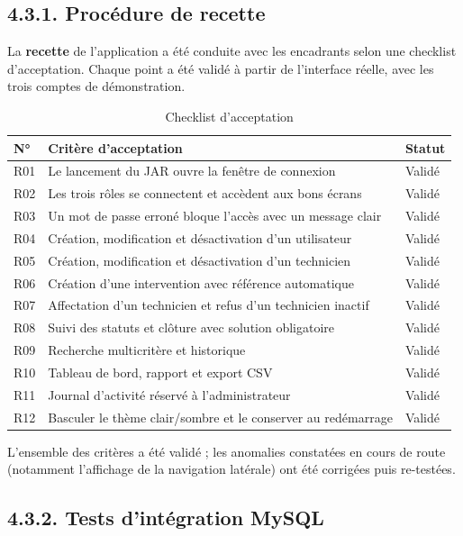 \documentclass[11pt,a4paper]{report}
\begin{document}
\subsection*{4.3.1. Procédure de recette}

La \textbf{recette} de l'application a été conduite avec les encadrants selon une checklist d'acceptation. Chaque point a été validé à partir de l'interface réelle, avec les trois comptes de démonstration.
\begin{table}[htbp]\centering\small
\begin{tabularx}{\textwidth}{|X|X|X|}
\hline\rowcolor{hdr}\textbf{N°} & \textbf{Critère d'acceptation} & \textbf{Statut}\\ \hline
R01 & Le lancement du JAR ouvre la fenêtre de connexion & Validé\\ \hline
R02 & Les trois rôles se connectent et accèdent aux bons écrans & Validé\\ \hline
R03 & Un mot de passe erroné bloque l'accès avec un message clair & Validé\\ \hline
R04 & Création, modification et désactivation d'un utilisateur & Validé\\ \hline
R05 & Création, modification et désactivation d'un technicien & Validé\\ \hline
R06 & Création d'une intervention avec référence automatique & Validé\\ \hline
R07 & Affectation d'un technicien et refus d'un technicien inactif & Validé\\ \hline
R08 & Suivi des statuts et clôture avec solution obligatoire & Validé\\ \hline
R09 & Recherche multicritère et historique & Validé\\ \hline
R10 & Tableau de bord, rapport et export CSV & Validé\\ \hline
R11 & Journal d'activité réservé à l'administrateur & Validé\\ \hline
R12 & Basculer le thème clair/sombre et le conserver au redémarrage & Validé\\ \hline
\end{tabularx}
\caption{Checklist d'acceptation}
\end{table}

L'ensemble des critères a été validé ; les anomalies constatées en cours de route (notamment l'affichage de la navigation latérale) ont été corrigées puis re-testées.
\subsection*{4.3.2. Tests d'intégration MySQL}
\end{document}
